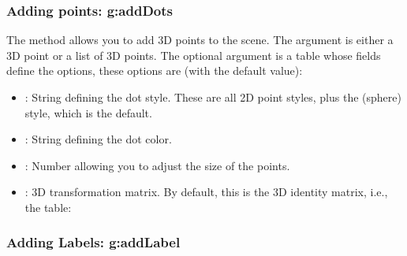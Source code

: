\subsubsection{Adding points: g:addDots}

The  method allows you to add 3D points to the scene. The argument  is either a 3D point or a list of 3D points. The optional argument  is a table whose fields define the options, these options are (with the default value):
\begin{itemize}
    \item {}: String defining the dot style. These are all 2D point styles, plus the  (sphere) style, which is the default.
    \item {}: String defining the dot color.
    \item {}: Number allowing you to adjust the size of the points.
    \item {}: 3D transformation matrix. By default, this is the 3D identity matrix, i.e., the table: 
\end{itemize}

\subsubsection{Adding Labels: g:addLabel}

